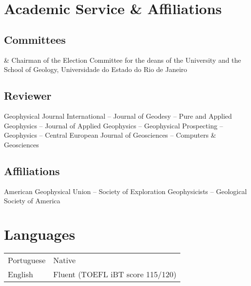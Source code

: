 \documentclass[11pt, a4paper]{article}
\newcommand{\TablePad}{\vspace{-0.4cm}}
\newcommand{\Year}[1]{\fontsize{10pt}{0}\selectfont #1}
\begin{document}
\section*{Academic Service \& Affiliations}

\subsection*{Committees}

\begin{EntriesTable}
    \Year{2015} & Chairman of the Election Committee for the deans of the
    University and the School of Geology, Universidade do Estado do Rio de
    Janeiro
\end{EntriesTable}


\subsection*{Reviewer}

Geophysical Journal International
--
Journal of Geodesy
--
Pure and Applied Geophysics
--
Journal of Applied Geophysics
--
Geophysical Prospecting
--
Geophysics
--
Central European Journal of Geosciences
--
Computers \& Geosciences


\subsection*{Affiliations}

American Geophysical Union
--
Society of Exploration Geophysicists
--
Geological Society of America


\section*{Languages}

\TablePad
\begin{tabularx}{\textwidth}{@{}p{} p{}@{}}
    Portuguese & Native
    \\
    English & Fluent (TOEFL iBT score 115/120)
\end{tabularx}
\end{document}
